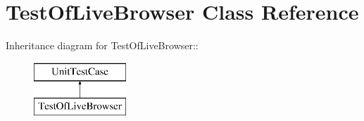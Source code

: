 \hypertarget{class_test_of_live_browser}{
\section{TestOfLiveBrowser Class Reference}
\label{class_test_of_live_browser}
}
Inheritance diagram for TestOfLiveBrowser::\begin{figure}[H]
\begin{center}
\leavevmode
\includegraphics[height=2cm]{class_test_of_live_browser}
\end{center}
\end{figure}
